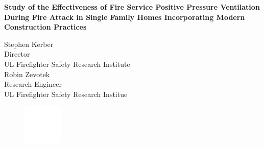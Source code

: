 \documentclass{article}
\begin{document}
	\begin{titlepage}
		
		\pagecolor{ULred}\afterpage{\nopagecolor}
		


			\vspace*{23\baselineskip} 

		\huge
		\begin{adjustwidth}{-0.5in}{-0in}
		\color{white}
		\textbf{Study of the Effectiveness of Fire Service Positive Pressure Ventilation During Fire Attack in Single Family Homes Incorporating Modern Construction Practices\\}
		\end{adjustwidth}
		\begin{adjustwidth}{-0.5in}{}
		\color{white}
		\vspace{.5in}
		\large
		Stephen Kerber\\
		Director \\
		UL Firefighter Safety Research Institute \\
		\vspace*{\baselineskip}
		Robin Zevotek \\
		Research Engineer \\
		UL Firefighter Safety Research Institue \\ 
		\vspace*{\baselineskip}
		\begin{figure}[h]
			\hspace*{-0.5in}\includegraphics[width=0.75in]{0_Images/Section_1/ULLogoWhite.pdf}
		\end{figure}
		\end{adjustwidth}
	\end{titlepage}
\end{document}
